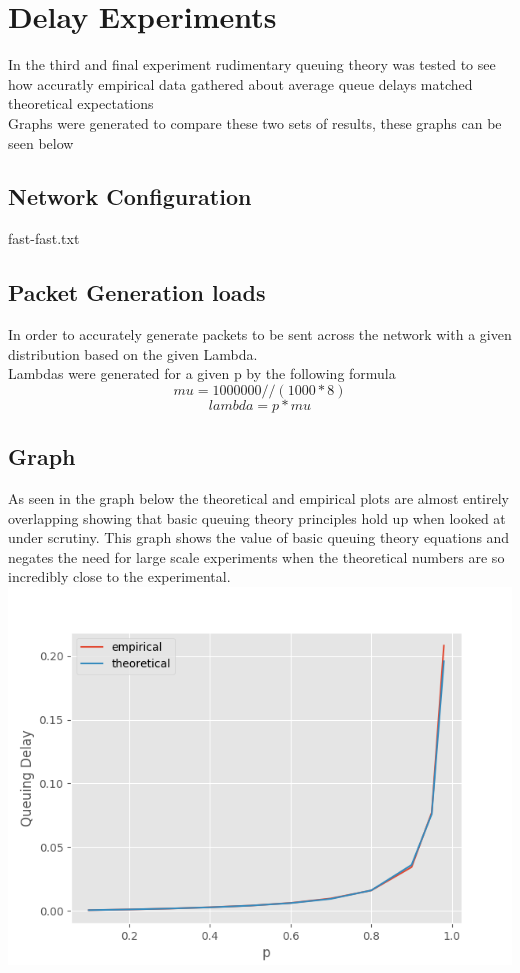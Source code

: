 \documentclass[12pt]{article}
\begin{document}
\section{Delay Experiments}
In the third and final experiment rudimentary queuing theory was tested to see how accuratly empirical data gathered about average queue delays matched theoretical expectations\\
Graphs were generated to compare these two sets of results, these graphs can be seen below\\

\subsection{Network Configuration}
\centerline{fast-fast.txt}


\subsection{Packet Generation loads}
In order to accurately generate packets to be sent across the network with a given distribution based on the given Lambda.\\
Lambdas were generated for a given p by the following formula\\
\begin{equation}
mu = 1000000 // (1000 * 8)
\end{equation}
\begin{equation}
lambda = p * mu
\end{equation} 

\subsection{Graph}
As seen in the graph below the theoretical and empirical plots are almost entirely overlapping showing that basic queuing theory principles hold up when looked at under scrutiny. This graph shows the value of basic queuing theory equations and negates the need for large scale experiments when the theoretical numbers are so incredibly close to the experimental.\\
\includegraphics[scale=.75]{../graphs/delay.png}
\end{document}
